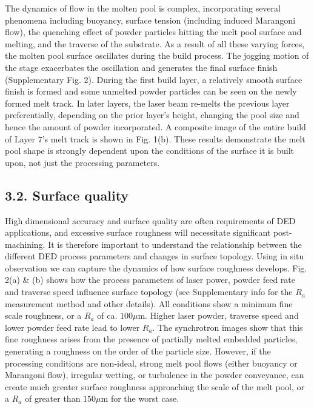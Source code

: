 \documentclass[10pt]{article}
\begin{document}
The dynamics of flow in the molten pool is complex, incorporating several phenomena including buoyancy, surface tension (including induced Marangoni flow), the quenching effect of powder particles hitting the melt pool surface and melting, and the traverse of the substrate. As a result of all these varying forces, the molten pool surface oscillates during the build process. The jogging motion of the stage exacerbates the oscillation and generates the final surface finish (Supplementary Fig. 2). During the first build layer, a relatively smooth surface finish is formed and some unmelted powder particles can be seen on the newly formed melt track. In later layers, the laser beam re-melts the previous layer preferentially, depending on the prior layer's height, changing the pool size and hence the amount of powder incorporated. A composite image of the entire build of Layer 7's melt track is shown in Fig. 1(b). These results demonstrate the melt pool shape is strongly dependent upon the conditions of the surface it is built upon, not just the processing parameters.

\subsection*{3.2. Surface quality}
High dimensional accuracy and surface quality are often requirements of DED applications, and excessive surface roughness will necessitate significant post-machining. It is therefore important to understand the relationship between the different DED process parameters and changes in surface topology. Using in situ observation we can capture the dynamics of how surface roughness develops. Fig. 2(a) \& (b) shows how the process parameters of laser power, powder feed rate and traverse speed influence surface topology (see Supplementary info for the $R_{a}$ measurement method and other details). All conditions show a minimum fine scale roughness, or a $R_{a}$ of ca. $100 \mu \mathrm{m}$. Higher laser powder, traverse speed and lower powder feed rate lead to lower $R_{a}$. The synchrotron images show that this fine roughness arises from the presence of partially melted embedded particles, generating a roughness on the order of the particle size. However, if the processing conditions are non-ideal, strong melt pool flows (either buoyancy or Marangoni flow), irregular wetting, or turbulence in the powder conveyance, can create much greater surface roughness approaching the scale of the melt pool, or a $R_{a}$ of greater than $150 \mu \mathrm{m}$ for the worst case.
\end{document}
